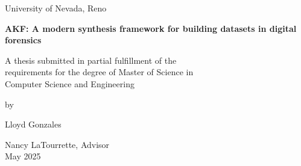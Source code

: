 \documentclass[letterpaper,12pt]{report}
\begin{document}

\newpage
\thispagestyle{empty}
\singlespacing

\begin{center}

\null

\vspace{1.5in}

University of Nevada, Reno \\

\vspace{1.5in}

\textbf{AKF: A modern synthesis framework for building datasets in digital forensics}

\vspace{1.5in}

A thesis submitted in partial fulfillment of the\\
requirements for the degree of Master of Science in\\
Computer Science and Engineering\\

\vspace{1in}

by

\vspace{0.25in}
Lloyd Gonzales
\vspace{0.5in}

Nancy LaTourrette, Advisor \\
May 2025\\

\end{center}


\setcounter{page}{0}

\newpage
\onehalfspace
\end{document}
